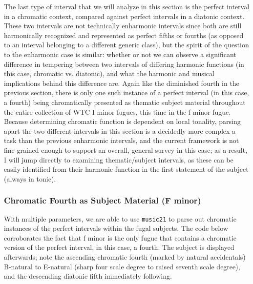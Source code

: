 The last type of interval that we will analyze in this section is the
perfect interval in a chromatic context, compared against perfect
intervals in a diatonic context. These two intervals are not technically
enharmonic intervals since both are still harmonically recognized and
represented as perfect fifths or fourths (as opposed to an interval
belonging to a different generic class), but the spirit of the question
to the enharmonic case is similar: whether or not we can observe a
significant difference in tempering between two intervals of differing
harmonic functions (in this case, chromatic vs. diatonic), and what the
harmonic and musical implications behind this difference are. Again like
the diminished fourth in the previous section, there is only one such
instance of a perfect interval (in this case, a fourth) being
chromatically presented as thematic subject material throughout the
entire collection of WTC I minor fugues, this time in the f minor fugue.
Because determining chromatic function is dependent on local tonality,
parsing apart the two different intervals in this section is a decidedly
more complex a task than the previous enharmonic intervals, and the
current framework is not fine-grained enough to support an overall,
general survey in this case; as a result, I will jump directly to
examining thematic/subject intervals, as these can be easily identified
from their harmonic function in the first statement of the subject
(always in tonic).

    \subsubsection{Chromatic Fourth as Subject Material (F
minor)}\label{chromatic-fourth-as-subject-material-f-minor}

With multiple parameters, we are able to use \texttt{music21} to parse
out chromatic instances of the perfect intervals within the fugal
subjects. The code below corroborates the fact that f minor is the only
fugue that contains a chromatic version of the perfect interval, in this
case, a fourth. The subject is displayed afterwards; note the ascending
chromatic fourth (marked by natural accidentals) B-natural to E-natural
(sharp four scale degree to raised seventh scale degree), and the
descending diatonic fifth immediately following.

